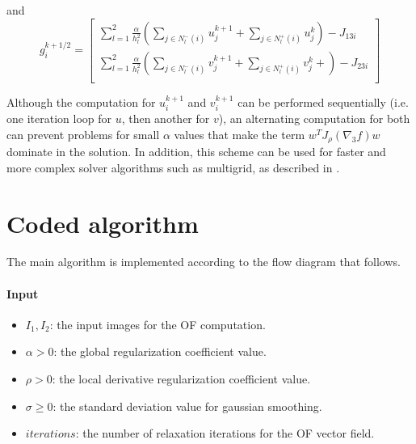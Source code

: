 \documentclass{article}
\begin{document}
and
\[ g_i^{k+1/2} =
 \left[ \begin{matrix}
  \displaystyle \sum_{l=1}^2 \frac{\alpha}{h_l^2} \left( \sum_{j \in N_l^-(i)} u_j^{k+1} + \sum_{j \in N_l^+(i)} u_j^{k} \right) - J_{13i} \\
  \displaystyle \sum_{l=1}^2 \frac{\alpha}{h_l^2} \left( \sum_{j \in N_l^-(i)} v_j^{k+1} + \sum_{j \in N_l^+(i)} v_j^{k}+ \right)- J_{23i} \\
 \end{matrix}
 \right]
\]


Although the computation for $u_i^{k+1}$ and $v_i^{k+1}$ can be performed 
sequentially (i.e. one iteration loop for $u$, then another for $v$), an 
alternating computation for both can prevent problems for small $\alpha$ values 
that make the term $w^T J_\rho (\nabla_3 f) w$ dominate in the solution. In 
addition, this scheme can be used for faster and more complex solver algorithms 
such as multigrid, as described in \cite{Bruhn05rt}.

\newpage
\section{Coded algorithm}

The main algorithm is implemented according to the flow diagram that follows.

\paragraph{Input}
\begin{itemize}
 \item $I_1, I_2$: the input images for the OF computation.
 \item $\alpha > 0$: the global regularization coefficient value.
 \item $\rho > 0$: the local derivative regularization coefficient value.
 \item $\sigma \geq 0$: the standard deviation value for gaussian smoothing.
 \item $iterations$: the number of relaxation iterations for the OF vector field.
\end{itemize}

\end{document}
